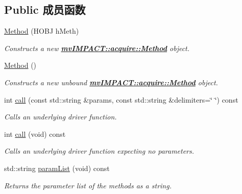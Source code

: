 \subsection*{Public 成员函数}
\begin{DoxyCompactItemize}
\item 
\hyperlink{classmv_i_m_p_a_c_t_1_1acquire_1_1_method_a7ac9d9a45808153f9e546cfffb0054cc}{Method} (H\+O\+B\+J h\+Meth)
\begin{DoxyCompactList}\small\item\em Constructs a new {\bfseries \hyperlink{classmv_i_m_p_a_c_t_1_1acquire_1_1_method}{mv\+I\+M\+P\+A\+C\+T\+::acquire\+::\+Method}} object. \end{DoxyCompactList}\item 
\hypertarget{classmv_i_m_p_a_c_t_1_1acquire_1_1_method_aba526610a9be9ec5ec3ade9461ddc9d5}{\hyperlink{classmv_i_m_p_a_c_t_1_1acquire_1_1_method_aba526610a9be9ec5ec3ade9461ddc9d5}{Method} ()}\label{classmv_i_m_p_a_c_t_1_1acquire_1_1_method_aba526610a9be9ec5ec3ade9461ddc9d5}

\begin{DoxyCompactList}\small\item\em Constructs a new unbound {\bfseries \hyperlink{classmv_i_m_p_a_c_t_1_1acquire_1_1_method}{mv\+I\+M\+P\+A\+C\+T\+::acquire\+::\+Method}} object. \end{DoxyCompactList}\item 
int \hyperlink{classmv_i_m_p_a_c_t_1_1acquire_1_1_method_a0f6be3f09242b7a2fab7e45342c80fb0}{call} (const std\+::string \&params, const std\+::string \&delimiters=\char`\"{} \char`\"{}) const 
\begin{DoxyCompactList}\small\item\em Calls an underlying driver function. \end{DoxyCompactList}\item 
int \hyperlink{classmv_i_m_p_a_c_t_1_1acquire_1_1_method_aab7d5d1adcacab0a13103a0038de6e5c}{call} (void) const 
\begin{DoxyCompactList}\small\item\em Calls an underlying driver function expecting no parameters. \end{DoxyCompactList}\item 
std\+::string \hyperlink{classmv_i_m_p_a_c_t_1_1acquire_1_1_method_ab938885a466ea43858e2709f7ba80b3f}{param\+List} (void) const 
\begin{DoxyCompactList}\small\item\em Returns the parameter list of the methods as a string. \end{DoxyCompactList}\end{DoxyCompactItemize}
